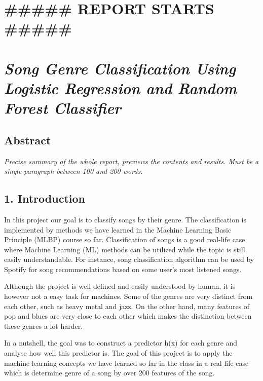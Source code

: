 \documentclass[11pt]{article}
\begin{document}
    \hypertarget{report-starts}{%
\section{\#\#\#\#\# REPORT STARTS \#\#\#\#\#}\label{report-starts}}

    \hypertarget{song-genre-classification-using-logistic-regression-and-random-forest-classifier}{%
\section{\texorpdfstring{\emph{Song Genre Classification Using Logistic
Regression and Random Forest
Classifier}}{Song Genre Classification Using Logistic Regression and Random Forest Classifier}}\label{song-genre-classification-using-logistic-regression-and-random-forest-classifier}}

    \hypertarget{abstract}{%
\subsection{Abstract}\label{abstract}}

    \emph{Precise summary of the whole report, previews the contents and
results. Must be a single paragraph between 100 and 200 words.}

    \hypertarget{introduction}{%
\subsection{1. Introduction}\label{introduction}}

    In this project our goal is to classify songs by their genre. The
classification is implemented by methods we have learned in the Machine
Learning Basic Principle (MLBP) course so far. Classification of songs
is a good real-life case where Machine Learning (ML) methods can be
utilized while the topic is still easily understandable. For instance,
song classification algorithm can be used by Spotify for song
recommendations based on some user's most listened songs.

Although the project is well defined and easily understood by human, it
is however not a easy task for machines. Some of the genres are very
distinct from each other, such as heavy metal and jazz. On the other
hand, many features of pop and blues are very close to each other which
makes the distinction between these genres a lot harder.

In a nutshell, the goal was to construct a predictor h(x) for each genre
and analyse how well this predictor is. The goal of this project is to
apply the machine learning concepts we have learned so far in the class
in a real life case which is determine genre of a song by over 200
features of the song.
\end{document}
